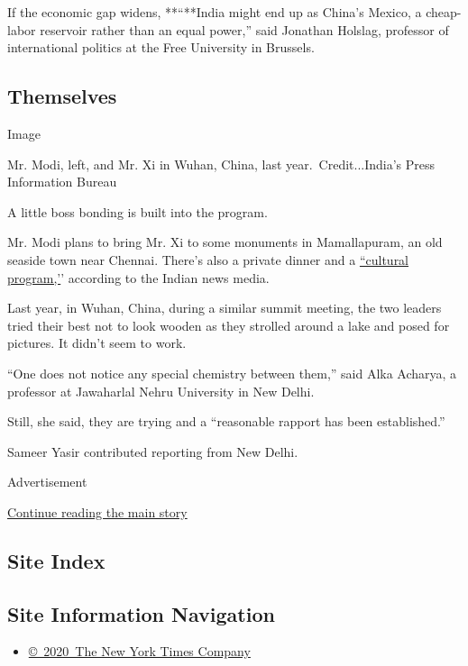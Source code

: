 If the economic gap widens, **``**India might end up as China's Mexico,
a cheap-labor reservoir rather than an equal power,'' said Jonathan
Holslag, professor of international politics at the Free University in
Brussels.

\hypertarget{themselves}{%
\subsection{Themselves}\label{themselves}}

Image

Mr. Modi, left, and Mr. Xi in Wuhan, China, last year.~Credit...India's
Press Information Bureau

A little boss bonding is built into the program.

Mr. Modi plans to bring Mr. Xi to some monuments in Mamallapuram, an old
seaside town near Chennai. There's also a private dinner and a
\href{https://www.hindustantimes.com/india-news/narendra-modi-and-xi-jinping-aim-for-wuhan-encore/story-2zVlXsadCbHfhl8MUi3BFN.html}{``cultural
program,'}' according to the Indian news media.

Last year, in Wuhan, China, during a similar summit meeting, the two
leaders tried their best not to look wooden as they strolled around a
lake and posed for pictures. It didn't seem to work.

``One does not notice any special chemistry between them,'' said Alka
Acharya, a professor at Jawaharlal Nehru University in New Delhi.

Still, she said, they are trying and a ``reasonable rapport has been
established.''

Sameer Yasir contributed reporting from New Delhi.

Advertisement

\protect\hyperlink{after-bottom}{Continue reading the main story}

\hypertarget{site-index}{%
\subsection{Site Index}\label{site-index}}

\hypertarget{site-information-navigation}{%
\subsection{Site Information
Navigation}\label{site-information-navigation}}

\begin{itemize}
\tightlist
\item
  \href{https://help.nytimes.com/hc/en-us/articles/115014792127-Copyright-notice}{©~2020~The
  New York Times Company}
\end{itemize}

